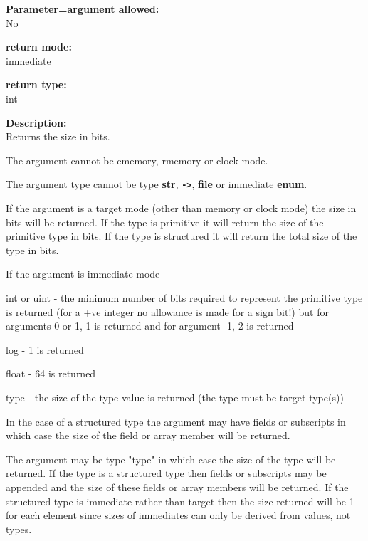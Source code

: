         {\bf Parameter=argument allowed:} \\
        No
        
        {\bf return mode:} \\
        immediate

        {\bf return type:} \\
        int
        
        {\bf Description:} \\
        Returns the size in bits.
        
        The argument cannot be cmemory, rmemory or clock mode.
        
        The argument type cannot be type {\bf str}, {\bf \verb'->'},
        {\bf file} or immediate {\bf enum}.
        
        If the argument is a target mode (other than memory or clock mode) the size
        in bits will be returned. If the type is primitive it will return the size
        of the primitive type in bits. If the type is structured it will return the
        total size of the type in bits.
        
        If the argument is immediate mode -
        \blist
        \item   int or uint - the minimum number of bits required to represent the
                primitive type is returned (for a +ve integer no allowance is made
                for a sign bit!) but for arguments 0 or 1, 1 is returned and for
                argument -1, 2 is returned
        \item   log - 1 is returned
        \item   float - 64 is returned
        \item   type - the size of the type value is returned (the type must
                be target type(s))
        \blend
        
        In the case of a structured type the argument may have fields or
        subscripts in which case the size of the field or array member will
        be returned.
        
        The argument may be type "type" in which case the size of the type will
        be returned. If the type is a structured type then fields or subscripts
        may be appended and the size of these fields or array members will be
        returned. If the structured type is immediate rather than target then the
        size returned will be 1 for each element since sizes of immediates
        can only be derived from values, not types.


